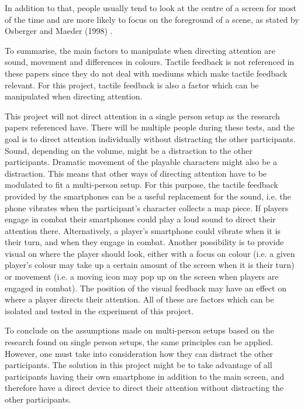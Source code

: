 In addition to that, people usually tend to look at the centre of a screen for most of the time and are more likely to focus on the foreground of a scene, as stated by Osberger and Maeder (1998) \cite{osberger1998automatic}.

To summarise, the main factors to manipulate when directing attention are sound, movement and differences in colours. Tactile feedback is not referenced in these papers since they do not deal with mediums which make tactile feedback relevant. For this project, tactile feedback is also a factor which can be manipulated when directing attention. 

This project will not direct attention in a single person setup as the research papers referenced have. There will be multiple people during these tests, and the goal is to direct attention individually without distracting the other participants. Sound, depending on the volume, might be a distraction to the other participants. Dramatic movement of the playable characters might also be a distraction. This means that other ways of directing attention have to be modulated to fit a multi-person setup. For this purpose, the tactile feedback provided by the smartphones can be a useful replacement for the sound, i.e. the phone vibrates when the participant's character collects a map piece. If players engage in combat their smartphones could play a loud sound to direct their attention there. Alternatively, a player's smartphone could vibrate when it is their turn, and when they engage in combat. Another possibility is to provide visual on where the player should look, either with a focus on colour (i.e. a given player's colour may take up a certain amount of the screen when it is their turn) or movement (i.e. a moving icon may pop up on the screen when players are engaged in combat). The position of the visual feedback may have an effect on where a player directs their attention. All of these are factors which can be isolated and tested in the experiment of this project.

To conclude on the assumptions made on multi-person setups based on the research found on single person setups, the same principles can be applied. However, one must take into consideration how they can distract the other participants. The solution in this project might be to take advantage of all participants having their own smartphone in addition to the main screen, and therefore have a direct device to direct their attention without distracting the other participants.
